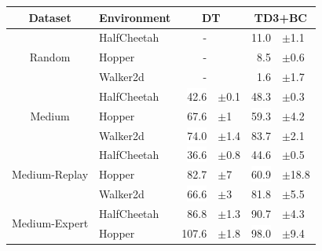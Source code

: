 \documentclass{article}
\begin{document}
\begin{table}[ht]
\centering
\addtolength{\tabcolsep}{4pt}
\begin{tabular}{clr@{\hspace{-1pt}}lr@{\hspace{-1pt}}l}
\toprule
Dataset              & Environment            & \multicolumn{2}{c}{DT}                                    & \multicolumn{2}{c}{TD3+BC} \\
\midrule
\multirow{3}{*}{Random}           & HalfCheetah & -                      &         & \colorbox{white}{11.0}     & {\color[HTML]{525252} $\pm$1.1}  \\
                                  & Hopper      & -                      &         & \colorbox{white}{8.5}    & {\color[HTML]{525252} $\pm$0.6}  \\
                                  & Walker2d    & -                      &         & \colorbox{white}{1.6}    & {\color[HTML]{525252} $\pm$1.7}  \\
\midrule
\multirow{3}{*}{Medium}		  	  & HalfCheetah & \colorbox{white}{42.6} & {\color[HTML]{525252} $\pm$0.1}  & \colorbox{mine}{48.3}    & {\color[HTML]{525252} $\pm$0.3}  \\
                                  & Hopper      & \colorbox{mine}{67.6}  & {\color[HTML]{525252} $\pm$1}    & \colorbox{white}{59.3}   & {\color[HTML]{525252} $\pm$4.2}  \\
						          & Walker2d    & \colorbox{white}{74.0}   & {\color[HTML]{525252} $\pm$1.4}  & \colorbox{mine}{83.7}    & {\color[HTML]{525252} $\pm$2.1}  \\
\midrule
\multirow{3}{*}{Medium-Replay}    & HalfCheetah & \colorbox{white}{36.6} & {\color[HTML]{525252} $\pm$0.8}  & \colorbox{mine}{44.6}    & {\color[HTML]{525252} $\pm$0.5}  \\
                                  & Hopper      & \colorbox{mine}{82.7}  & {\color[HTML]{525252} $\pm$7}    & \colorbox{white}{60.9}   & {\color[HTML]{525252} $\pm$18.8} \\
								  & Walker2d    & \colorbox{white}{66.6} & {\color[HTML]{525252} $\pm$3}    & \colorbox{mine}{81.8}    & {\color[HTML]{525252} $\pm$5.5}  \\
\midrule
\multirow{3}{*}{Medium-Expert}    & HalfCheetah & \colorbox{mine}{86.8}  & {\color[HTML]{525252} $\pm$1.3}  & \colorbox{mine}{90.7}    & {\color[HTML]{525252} $\pm$4.3}  \\
                                  & Hopper      & \colorbox{mine}{107.6} & {\color[HTML]{525252} $\pm$1.8}  & \colorbox{white}{98.0}     & {\color[HTML]{525252} $\pm$9.4}  \\

\end{tabular}
\end{table}
\end{document}
